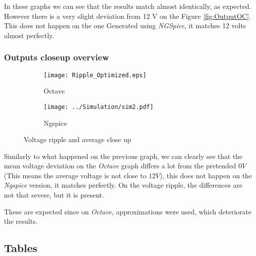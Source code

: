 \indent

In these graphs we can see that the results match almost identically, as expected. However there is a very slight deviation from 12 V on the Figure \ref{fig:OutputOC}. This does not happen on the one Generated using \textit{NGSpice}, it matches 12 volts almost perfectly.

\subsubsection{Outputs closeup overview}

\begin{figure}[H]
\centering
\begin{subfigure}{.5\textwidth}
  \centering
  \texttt{[image: Ripple\_Optimized.eps]}
  \caption{Octave}
\end{subfigure}%
\begin{subfigure}{.5\textwidth}
  \centering
  \texttt{[image: ../Simulation/sim2.pdf]}
  \caption{Ngspice}
\end{subfigure}
\caption{Voltage ripple and average close up}
\label{fig:OutputCloseUp}
\end{figure}

\indent

Similarly to what happened on the previous graph, we can clearly see that the mean voltage deviation on the \textit{Octave} graph differs a lot from the pretended $0V$ (This means the average voltage is not close to $12V$), this does not happen on the \textit{Ngspice} version, it matches perfectly.
On the voltage ripple, the differences are not that severe, but it is present. 

These are expected since on \textit{Octave}, approximations were used, which deteriorate the results.


\subsection{Tables}



